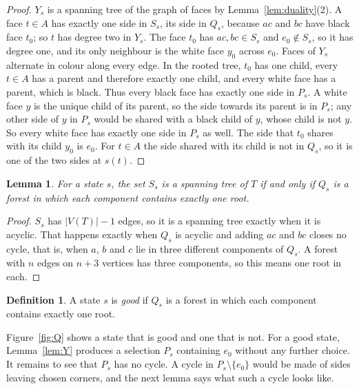 \documentclass[10pt]{amsart}
\numberwithin{equation}{section}
\newtheorem{lemma}[equation]{Lemma}
\theoremstyle{definition}
\newtheorem{definition}[equation]{Definition}
\theoremstyle{remark}
\newcommand{\T}{T}
\begin{document}
\begin{proof}
$Y_s$ is a spanning tree of the graph of faces by Lemma~\ref{lem:duality}(2).
A face $t\in A$ has exactly one side in $S_s$, its side in $Q_s$, because $ac$ and $bc$ have black face $t_0$; so $t$ has degree two in $Y_s$.
The face $t_0$ has $ac,bc\in S_s$ and $e_0\notin S_s$, so it has degree one, and its only neighbour is the white face $y_0$ across $e_0$.
Faces of $Y_s$ alternate in colour along every edge.
In the rooted tree, $t_0$ has one child, every $t\in A$ has a parent and therefore exactly one child, and every white face has a parent, which is black.
Thus every black face has exactly one side in $P_s$.
A white face $y$ is the unique child of its parent, so the side towards its parent is in $P_s$; any other side of $y$ in $P_s$ would be shared with a black child of $y$, whose child is not $y$.
So every white face has exactly one side in $P_s$ as well.
The side that $t_0$ shares with its child $y_0$ is $e_0$.
For $t\in A$ the side shared with its child is not in $Q_s$, so it is one of the two sides at $s(t)$.
\end{proof}

\begin{lemma}\label{lem:good}
For a state $s$, the set $S_s$ is a spanning tree of $\T$ if and only if $Q_s$ is a forest in which each component contains exactly one root.
\end{lemma}

\begin{proof}
$S_s$ has $|V(\T)|-1$ edges, so it is a spanning tree exactly when it is acyclic.
That happens exactly when $Q_s$ is acyclic and adding $ac$ and $bc$ closes no cycle, that is, when $a$, $b$ and $c$ lie in three different components of $Q_s$.
A forest with $n$ edges on $n+3$ vertices has three components, so this means one root in each.
\end{proof}

\begin{definition}
A state $s$ is \emph{good} if $Q_s$ is a forest in which each component contains exactly one root.
\end{definition}

Figure~\ref{fig:Q} shows a state that is good and one that is not.
For a good state, Lemma~\ref{lem:Y} produces a selection $P_s$ containing $e_0$ without any further choice.
It remains to see that $P_s$ has no cycle.
A cycle in $P_s\setminus\{e_0\}$ would be made of sides leaving chosen corners, and the next lemma says what such a cycle looks like.
\end{document}
